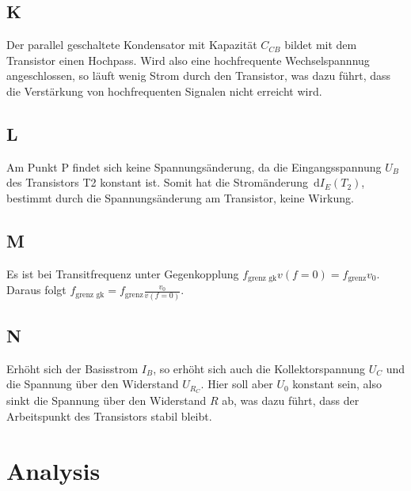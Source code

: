\documentclass[a4paper,10pt]{article}
\newcommand{\td}{\,\text{d}}
\numberwithin{equation}{section}
\begin{document}
\begin{multicols}{2}
	\subsection{K}
	Der parallel geschaltete Kondensator mit Kapazität $C_{CB}$ bildet mit dem Transistor einen Hochpass.
	Wird also eine hochfrequente Wechselspannnug angeschlossen, so läuft wenig Strom durch den Transistor, was dazu führt, dass die Verstärkung von hochfrequenten Signalen nicht erreicht wird.

	\subsection{L}
	Am Punkt P findet sich keine Spannungsänderung, da die Eingangsspannung $U_B$ des Transistors T2 konstant ist.
	Somit hat die Stromänderung $\td I_E\left(T_2\right)$, bestimmt durch die Spannungsänderung am Transistor, keine Wirkung.

	\subsection{M}
	Es ist bei Transitfrequenz unter Gegenkopplung $f_\text{grenz gk}v\left(f=0\right)=f_\text{grenz}v_0$.
	Daraus folgt $f_\text{grenz gk}=f_\text{grenz}\tfrac{v_0}{v\left(f=0\right)}$.

	\subsection{N}
	Erhöht sich der Basisstrom $I_B$, so erhöht sich auch die Kollektorspannung $U_C$ und die Spannung über den Widerstand $U_{R_C}$.
	Hier soll aber $U_0$ konstant sein, also sinkt die Spannung über den Widerstand $R$ ab, was dazu führt, dass der Arbeitspunkt des Transistors stabil bleibt.

	\clearpage
	\section{Analysis}

\end{multicols}
\end{document}
